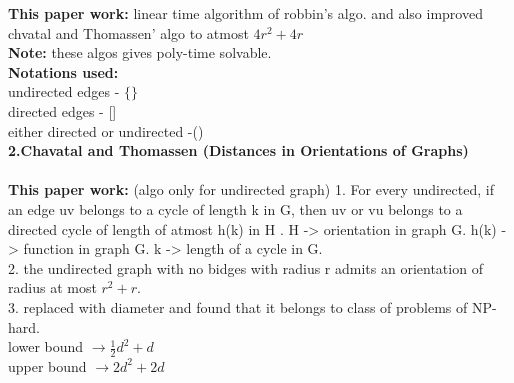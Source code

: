 \documentclass{article}
\begin{document}
{\vspace{1cm}
  \textbf{This paper work:} linear time algorithm of robbin's algo. and also improved chvatal and Thomassen' algo to atmost
   $4r^{2}+4r$ \\
\textbf{Note:} these algos
gives poly-time solvable. \\
   
\vspace{2cm} 
\textbf{Notations used:}\\
undirected edges - $\lbrace\rbrace$ \\
directed edges - []\\
either directed or undirected -()\\
\newpage
\textbf{2.Chavatal and Thomassen (Distances in Orientations of Graphs)} \\
\vspace{1 cm} \\
\textbf{This paper work:} (algo only for undirected graph)
1. For every undirected, if an edge uv belongs to a cycle of length k in G, then uv or vu belongs to a directed cycle of length of 
atmost h(k) in H . H -> orientation in graph G. h(k) -> function in graph G. k -> length of a cycle in G. \\
2. the undirected graph with no bidges with radius r admits an orientation of radius at most $r^{2}+r$. \\
3. replaced with diameter and found that it belongs to class of problems of NP-hard.\\
lower bound $ \rightarrow \frac{1}{2}d^{2}+d$ \\
upper bound $ \rightarrow 2d^{2}+2d$\\

}
\end{document}
